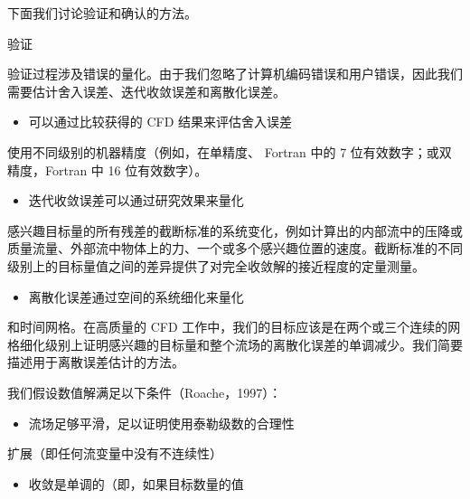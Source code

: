 \documentclass[11pt,a4paper,openany,fontset=none]{ctexbook}
\begin{document}
下面我们讨论验证和确认的方法。

验证

验证过程涉及错误的量化。由于我们忽略了计算机编码错误和用户错误，因此我们需要估计舍入误差、迭代收敛误差和离散化误差。

\begin{itemize}

\item 可以通过比较获得的 CFD 结果来评估舍入误差

\end{itemize}

使用不同级别的机器精度（例如，在单精度、
Fortran 中的 7 位有效数字；或双精度，Fortran 中 16 位有效数字）。

\begin{itemize}

\item 迭代收敛误差可以通过研究效果来量化

\end{itemize}

感兴趣目标量的所有残差的截断标准的系统变化，例如计算出的内部流中的压降或质量流量、外部流中物体上的力、一个或多个感兴趣位置的速度。截断标准的不同级别上的目标量值之间的差异提供了对完全收敛解的接近程度的定量测量。

\begin{itemize}

\item 离散化误差通过空间的系统细化来量化

\end{itemize}

和时间网格。在高质量的 CFD 工作中，我们的目标应该是在两个或三个连续的网格细化级别上证明感兴趣的目标量和整个流场的离散化误差的单调减少。我们简要描述用于离散误差估计的方法。

我们假设数值解满足以下条件（Roache，1997）：

\begin{itemize}

\item 流场足够平滑，足以证明使用泰勒级数的合理性

\end{itemize}

扩展（即任何流变量中没有不连续性）

\begin{itemize}

\item 收敛是单调的（即，如果目标数量的值

\end{itemize}
\end{document}
